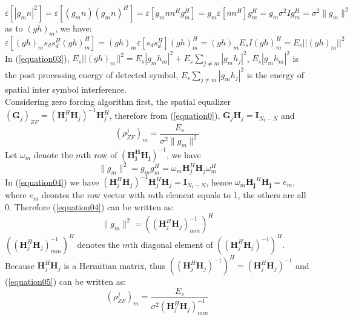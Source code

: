 \documentclass[12pt,a4paper,final]{article}
\begin{document}
\begin{spacing}{2.5}
\begin{equation}
\varepsilon[|g_{m}n|^{2}]= \varepsilon[(g_{m}n)(g_{m}n)^{H}]=\varepsilon[g_{m}nn^{H}g_{m}^{H}]=g_{m}\varepsilon[nn^{H}]g_{m}^{H}=g_{m}\sigma^{2}Ig_{m}^{H}
=\sigma^{2}\parallel g_{m} \parallel^{2}
\end{equation}
as to $(gh)_{m}$, we have:
\begin{equation}
\varepsilon[(gh)_{m}s_{d}s_{d}^{H}(gh)_{m}^{H}]=(gh)_{m}\varepsilon[s_{d}s_{d}^{H}](gh)_{m}^{H}=(gh)_{m}E_{s}I(gh)_{m}^{H} =E_{s}||(gh)_{m}||^{2}\label{equation03}
\end{equation}
In (\ref{equation03}), $E_{s}||(gh)_{m}||^{2}=E_{s}|g_{m}h_{m}|^{2}+E_{s}\sum_{j\neq m}|g_{m}h_{j}|^{2}$, $E_{s}|g_{m}h_{m}|^{2}$ is the post processing energy of detected symbol, $E_{s}\sum_{j\neq m}|g_{m}h_{j}|^{2}$ is the energy of spatial inter symbol interference. \\
Considering zero forcing algorithm first, the spatial equalizer $(\mathbf{G}_{j})_{ZF}=(\mathbf{H}_{j}^{H}\mathbf{H}_{j})^{-1}\mathbf{H}_{j}^{H}$, therefore from (\ref{equation0}), $\mathbf{G}_{j}\mathbf{H}_{j}=\mathbf{I}_{N_t-N}$ and
\begin{equation}
(\rho_{ZF}^{j})_{m}=\frac{E_{s}}{\sigma^{2}\parallel g_{m} \parallel^{2}}\label{equation05}
\end{equation}
Let $\omega_{m}$ denote the $m$th row of $(\mathbf{H_{j}^{H}H_{j}})^{-1}$, we have
\begin{equation}
\parallel g_{m} \parallel^{2}=g_{m}g_{m}^{H}=\omega_{m}\mathbf{H}_{j}^{H}\mathbf{H}_{j}\omega_{m}^{H}\label{equation04}
\end{equation}
In (\ref{equation04}) we have $(\mathbf{H}_{j}^{H}\mathbf{H}_{j})^{-1}\mathbf{H}_{j}^{H}\mathbf{H}_{j}=\mathbf{I}_{N_t-N}$, hence $\omega_{m}\mathbf{H_{j}}^{H}\mathbf{H_{j}}=e_{m}$, where $e_{m}$ deontes the row vector with $m$th element equals to 1, the others are all 0. Therefore (\ref{equation04}) can be written as:
\begin{equation}
\parallel g_{m} \parallel^{2}=((\mathbf{H}_{j}^{H}\mathbf{H}_{j})^{-1}_{mm})^{H}
\end{equation}
$((\mathbf{H}_{j}^{H}\mathbf{H}_{j})^{-1}_{mm})^{H}$ denotes the $m$th diagonal element of $((\mathbf{H}_{j}^{H}\mathbf{H}_{j})^{-1})^{H}$. Because $\mathbf{H}_{j}^{H}\mathbf{H}_{j}$ is a Hermitian matrix, thus $((\mathbf{H}_{j}^{H}\mathbf{H}_{j})^{-1})^{H}=(\mathbf{H}_{j}^{H}\mathbf{H}_{j})^{-1}$\cite{7} and (\ref{equation05}) can be written as:
\begin{equation}
(\rho_{ZF}^{j})_{m}=\frac{E_{s}}{\sigma^{2}(\mathbf{H}_{j}^{H}\mathbf{H}_{j})_{mm}^{-1}}\label{equation02}

\end{equation}
\end{spacing}
\end{document}
